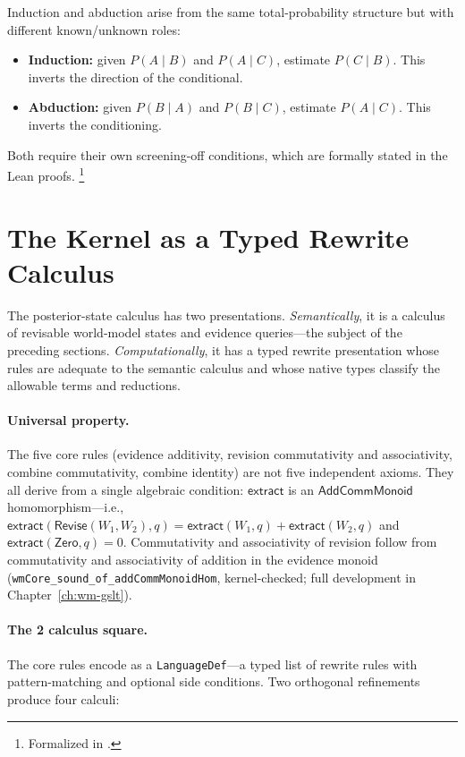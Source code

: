 \documentclass[11pt,openany]{report}
\begin{document}
Induction and abduction arise from the same total-probability structure
but with different known/unknown roles:

\begin{itemize}
\item \textbf{Induction:} given $P(A \mid B)$ and $P(A \mid C)$,
  estimate $P(C \mid B)$.  This inverts the direction of the conditional.
\item \textbf{Abduction:} given $P(B \mid A)$ and $P(B \mid C)$,
  estimate $P(A \mid C)$.  This inverts the conditioning.
\end{itemize}

Both require their own screening-off conditions, which are
formally stated in the Lean proofs.%
\footnote{Formalized in .}

\section{The Kernel as a Typed Rewrite Calculus}
\label{sec:kernel-typed-rewrite}

The posterior-state calculus has two presentations.  \emph{Semantically},
it is a calculus of revisable world-model states and evidence queries---the
subject of the preceding sections.  \emph{Computationally}, it has a typed
rewrite presentation whose rules are adequate to the semantic calculus and
whose native types classify the allowable terms and reductions.

\paragraph{Universal property.}
The five core rules (evidence additivity, revision commutativity and
associativity, combine commutativity, combine identity) are not five
independent axioms.  They all derive from a single algebraic condition:
$\mathsf{extract}$ is an $\mathsf{AddCommMonoid}$ homomorphism---i.e.,
$\mathsf{extract}(\mathsf{Revise}(W_1,W_2), q) =
\mathsf{extract}(W_1, q) + \mathsf{extract}(W_2, q)$ and
$\mathsf{extract}(\mathsf{Zero}, q) = 0$.  Commutativity and associativity
of revision follow from commutativity and associativity of addition in the
evidence monoid (\texttt{wmCore\_sound\_of\_addCommMonoidHom},
kernel-checked; full development in Chapter~\ref{ch:wm-gslt}).

\paragraph{The 2 calculus square.}
The core rules encode as a \texttt{LanguageDef}---a typed list of
rewrite rules with pattern-matching and optional side conditions.  Two
orthogonal refinements produce four calculi:
\end{document}
